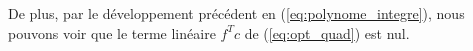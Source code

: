 \documentclass{article}
\begin{document}
De plus, par le développement précédent en (\ref{eq:polynome_integre}), nous pouvons voir que le terme linéaire $f^Tc$ de (\ref{eq:opt_quad}) est nul.

%
%
\end{document}
